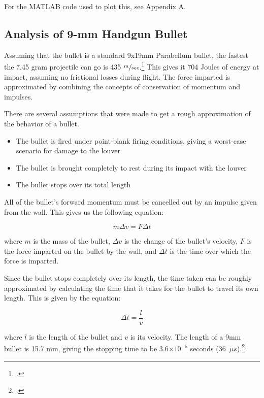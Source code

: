 \documentclass[12pt,letterpaper]{report}
\providecommand{\e}[1]{\ensuremath{\times 10^{#1}}} %
\begin{document}
		For the MATLAB code used to plot this, see Appendix A.
		
		\subsection{Analysis of 9-mm Handgun Bullet}
		
		Assuming that the bullet is a standard 9x19mm Parabellum bullet, the fastest the 7.45 gram projectile can go is 435 $\sfrac{m}{sec}$.\footcite{wiki:9mm}  This gives it 704 Joules of energy at impact, assuming no frictional losses during flight.  The force imparted is approximated by combining the concepts of conservation of momentum and impulses.
		
		There are several assumptions that were made to get a rough approximation of the behavior of a bullet.
		\begin{itemize}
			\item The bullet is fired under point-blank firing conditions, giving a worst-case scenario for damage to the louver
			\item The bullet is brought completely to rest during its impact with the louver
			\item The bullet stops over its total length
		\end{itemize}
		
		All of the bullet's forward momentum must be cancelled out by an impulse given from the wall.  This gives us the following equation:
		
		\begin{equation}
		m \Delta v = F \Delta t
		\label{eq:momentum-impulse}
		\end{equation}
		
		where $m$ is the mass of the bullet, $\Delta v$ is the change of the bullet's velocity, $F$ is the force imparted on the bullet by the wall, and $\Delta t$ is the time over which the force is imparted.
		
		Since the bullet stops completely over its length, the time taken can be roughly approximated by calculating the time that it takes for the bullet to travel its own length.  This is given by the equation:
		
		\begin{equation}
		\Delta t = \frac{l}{v}
		\end{equation}
		
		where $l$ is the length of the bullet and $v$ is its velocity.  The length of a 9mm bullet is 15.7 mm, giving the stopping time to be 3.6\e{-5} seconds (\mbox{36 $\mu s$}).\footcite{pic:9mm}
		
\end{document}
